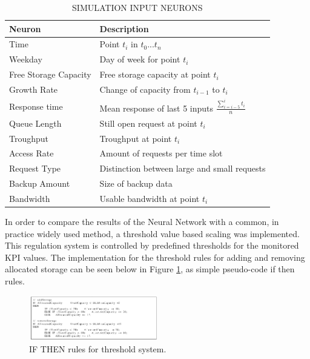\begin{table}[ht]
	\caption{SIMULATION INPUT NEURONS}
	\begin{center}
		\begin{tabular}{|l|l|}
			\hline
			Neuron & Description\\
			\hline
			Time & Point $ t_{i}  $ in $ t_{0} ... t_{n} $ \\
			\hdashline[.2pt/2pt]
			Weekday  & Day of week for point $ t_{i}  $ \\
			\hdashline[.2pt/2pt]    
			Free Storage Capacity & Free storage capacity at point $ t_{i}  $\\
			\hdashline[.2pt/2pt]
			Growth Rate & Change of capacity from $ t_{i-1}  $ to $ t_{i}  $\\
			\hdashline[.2pt/2pt]
			Response time &  Mean response of last 5 inputs $ \frac{\sum_{i=i-5}^{i} t_i}{n}$\\
			\hdashline[.2pt/2pt]
			Queue Length  & Still open request at point $ t_{i}  $ \\
			\hdashline[.2pt/2pt]
			Troughput &  Troughput at point $ t_{i}  $ \\
			\hdashline[.2pt/2pt]
			Access Rate& Amount of requests per time slot \\
			\hdashline[.2pt/2pt]
			Request Type & Distinction between large and small requests\\
			\hdashline[.2pt/2pt]
			Backup Amount &  Size of backup data\\
			\hdashline[.2pt/2pt]
			Bandwidth & Usable bandwidth at point $ t_{i}$  \\
			\hline
		\end{tabular}
	\end{center}
	\label{tab:input}
\end{table}

In order to compare the results of the Neural Network with a common, in practice widely used method, a threshold value based scaling was implemented. This regulation system is controlled by predefined thresholds for the monitored KPI values. The implementation for the threshold rules for adding and removing allocated storage can be seen below in Figure \ref{fig:listing}, as simple pseudo-code if then rules.
\\

\begin{figure}[ht]
	\begin{center}
		\includegraphics[width=0.5\textwidth]{fig/listing.png}
	\end{center}
	\caption{IF THEN rules for threshold system.}
	\label{fig:listing}
\end{figure}

